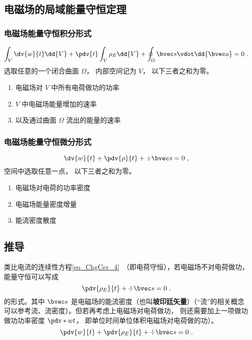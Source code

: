 \subsection{电磁场的局域能量守恒定理}

\subsubsection{电磁场能量守恒积分形式}
\begin{equation}
\int_V \dv{w}{t} \dd{V}  + \pdv{t} \int_V \rho_E \dd{V}  + \oint_\Omega  \bvec s \vdot \dd{\bvec a}  = 0~.
\end{equation} 
选取任意的一个闭合曲面 $\Omega $， 内部空间记为 $V$， 以下三者之和为零。
\begin{enumerate}
\item 电磁场对 $V$ 中所有电荷做功的功率
\item $V$ 中电磁场能量增加的速率
\item 以及通过曲面 $\Omega $ 流出的能量的速率
\end{enumerate}

\subsubsection{电磁场能量守恒微分形式}
\begin{equation}
\dv{w}{t} + \pdv{\rho}{t} + \div \bvec s = 0~,
\end{equation} 
空间中选取任意一点， 以下三者之和为零。
\begin{enumerate}
\item 电磁场对电荷的功率密度
\item 电磁场能量密度增量
\item 能流密度散度
\end{enumerate}

\subsection{推导}
类比电流的连续性方程\autoref{eq_ChgCsv_4}~（即电荷守恒），若电磁场不对电荷做功，能量守恒可以写成
\begin{equation}
\pdv{\rho_E}{t} + \div \bvec s = 0~.
\end{equation} 
的形式。其中 $\bvec s$ 是电磁场的能流密度（也叫\textbf{坡印廷矢量}）（“流”的相关概念可以参考流、流密度）。但若再考虑上电磁场对电荷做功， 则还需要加上一项做功做功功率密度 $\pdv*{w}{t}$， 即单位时间单位体积电磁场对电荷做的功）。
\begin{equation}\label{eq_EBS_1}
\pdv{w}{t} + \pdv{\rho_E}{t} + \div \bvec s = 0~.
\end{equation} 

